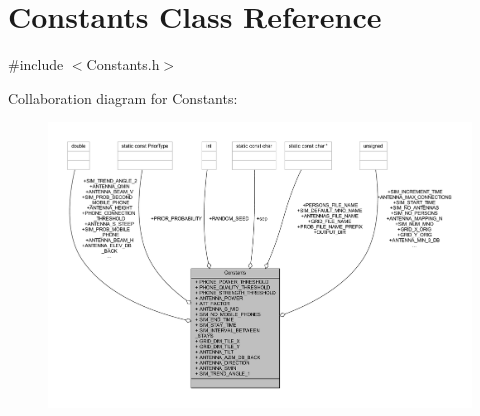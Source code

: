 \hypertarget{class_constants}{}\section{Constants Class Reference}
\label{class_constants}


{\ttfamily \#include $<$Constants.\+h$>$}



Collaboration diagram for Constants\+:
\nopagebreak
\begin{figure}[H]
\begin{center}
\leavevmode
\includegraphics[width=350pt]{class_constants__coll__graph}
\end{center}
\end{figure}
